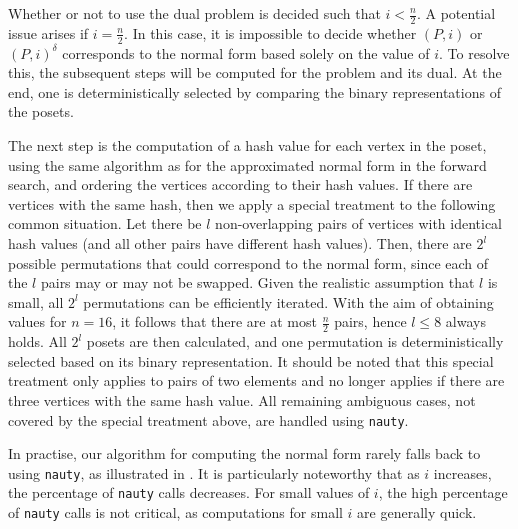 \documentclass[a4paper,UKenglish,cleveref, autoref, thm-restate]{lipics-v2021}
\newcommand{\dual}[1]{{#1}^{\delta}}
\begin{document}
Whether or not to use the dual problem is decided such that $i < \tfrac{n}{2}$.
A potential issue arises if $i = \tfrac{n}{2}$.
In this case, it is impossible to decide whether $(P, i)$ or $\dual{(P, i)}$ corresponds to the normal form based solely on the value of $i$.
To resolve this, the subsequent steps will be computed for the problem and its dual.
At the end, one is deterministically selected by comparing the binary representations of the posets.

The next step is the computation of a hash value for each vertex in the poset, using the same algorithm as for the approximated normal form in the forward search, and ordering the vertices according to their hash values.
If there are vertices with the same hash, then we apply a special treatment to the following common situation.
Let there be $l$ non-overlapping pairs of vertices with identical hash values (and all other pairs have different hash values).
Then, there are $2^l$ possible permutations that could correspond to the normal form, since each of the $l$ pairs may or may not be swapped.
Given the realistic assumption that $l$ is small, all $2^l$ permutations can be efficiently iterated.
With the aim of obtaining values for $n = 16$, it follows that there are at most $\frac{n}{2}$ pairs, hence $l \leq 8$ always holds.
All $2^l$ posets are then calculated, and one permutation is deterministically selected based on its binary representation.
It should be noted that this special treatment only applies to pairs of two elements and no longer applies if there are three vertices with the same hash value.
All remaining ambiguous cases, not covered by the special treatment above, are handled using \texttt{nauty}.

In practise, our algorithm for computing the normal form rarely falls back to using \texttt{nauty}, as illustrated in .
It is particularly noteworthy that as $i$ increases, the percentage of \texttt{nauty} calls decreases.
For small values of $i$, the high percentage of \texttt{nauty} calls is not critical, as computations for small $i$ are generally quick.
\end{document}
